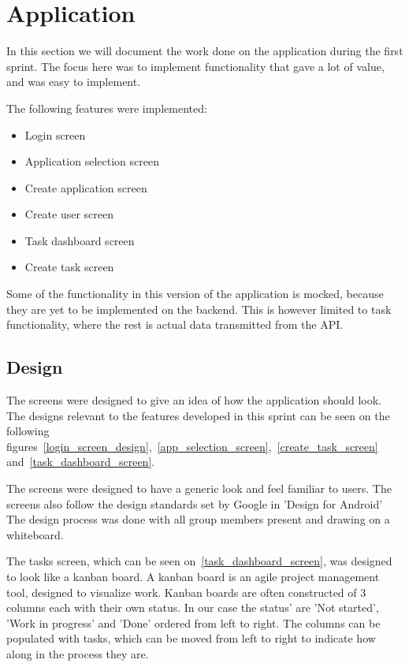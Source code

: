 \section{Application}
In this section we will document the work done on the application during the first sprint.
The focus here was to implement functionality that gave a lot of value, and was easy to implement.

The following features were implemented:
\begin{itemize}
    \item Login screen
    \item Application selection screen
    \item Create application screen
    \item Create user screen
    \item Task dashboard screen
    \item Create task screen
\end{itemize}

Some of the functionality in this version of the application is mocked, because they are yet to be implemented on the backend.
This is however limited to task functionality, where the rest is actual data transmitted from the API.

\subsection{Design}
\label{sprint_1_design}
The screens were designed to give an idea of how the application should look.
The designs relevant to the features developed in this sprint can be seen on the following figures~\autoref{login_screen_design},~\autoref{app_selection_screen},~\autoref{create_task_screen} and~\autoref{task_dashboard_screen}.

The screens were designed to have a generic look and feel familiar to users.
The screens also follow the design standards set by Google in 'Design for Android' \cite{AndroidDesign}
The design process was done with all group members present and drawing on a whiteboard.



The tasks screen, which can be seen on~\autoref{task_dashboard_screen}, was designed to look like a kanban board.
A kanban board is an agile project management tool, designed to visualize work.
Kanban boards are often constructed of 3 columns each with their own status. In our case the status' are 'Not started', 'Work in progress' and 'Done' ordered from left to right.
The columns can be populated with tasks, which can be moved from left to right to indicate how along in the process they are.

